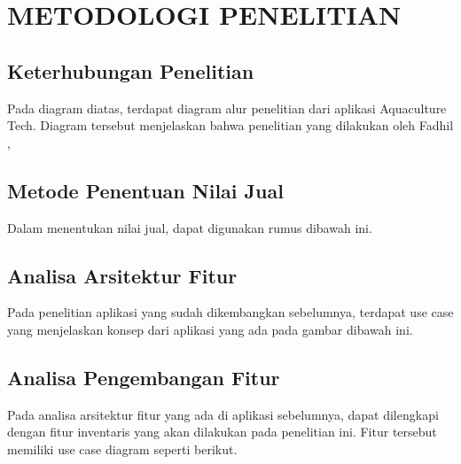 
\chapter{METODOLOGI PENELITIAN}

\section{Keterhubungan Penelitian}

Pada diagram diatas, terdapat diagram alur penelitian dari aplikasi Aquaculture Tech. Diagram tersebut menjelaskan bahwa penelitian yang dilakukan oleh Fadhil \citep{fadhil2022}, 

\section{Metode Penentuan Nilai Jual}

Dalam menentukan nilai jual, dapat digunakan rumus dibawah ini.

\section{Analisa Arsitektur Fitur}

Pada penelitian aplikasi yang sudah dikembangkan sebelumnya, terdapat use case yang menjelaskan konsep dari aplikasi yang ada pada gambar dibawah ini.


\section{Analisa Pengembangan Fitur}

Pada analisa arsitektur fitur yang ada di aplikasi sebelumnya, dapat dilengkapi dengan fitur inventaris yang akan dilakukan pada penelitian ini. Fitur tersebut memiliki use case diagram seperti berikut.




